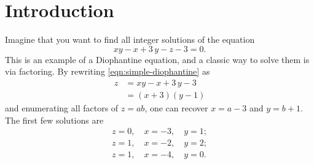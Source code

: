 \section{Introduction}

Imagine that you want to find all integer solutions of the equation
\begin{equation}
    \label{eqn:simple-diophantine}
    x y - x + 3 \, y - z - 3 = 0.
\end{equation}
This is an example of a Diophantine equation, and a classic way to solve them is via factoring. By rewriting \autoref{eqn:simple-diophantine} as
\begin{equation}
    \begin{aligned}
        z & = x y - x + 3 \, y - 3                 \\
          & = \left(x + 3\right)\left(y - 1\right)
    \end{aligned}
\end{equation}
and enumerating all factors of $z = ab$, one can recover $x = a - 3$ and $y = b + 1$. The first few solutions are
\begin{equation}
    \begin{gathered}
        z = 0, \quad
        x = -3, \quad
        y = 1; \\
        z = 1, \quad
        x = -2, \quad
        y = 2; \\
        z = 1, \quad
        x = -4, \quad
        y = 0.
    \end{gathered}
\end{equation}

